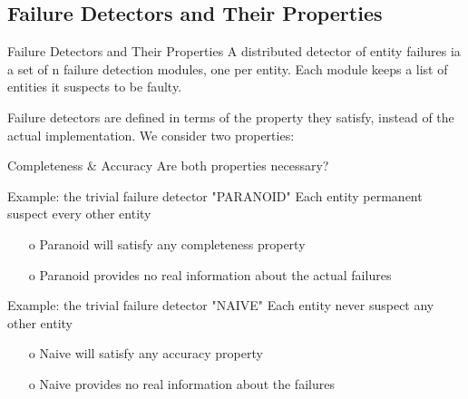 \documentclass{beamer}
\begin{document}
\subsection{Failure Detectors and Their Properties}
\begin{frame}{Failure Detectors and Their Properties}
A distributed detector of entity failures ia a set of n failure detection modules, one per entity. Each module keeps a list of entities it suspects to be faulty.
\begin{flushleft}
Failure detectors are defined in terms of the property they satisfy, instead of the actual implementation. We consider two properties:
\end{flushleft}
\begin{center}
\: \: \: \: \: \: \: \:
\end{center}
\end{frame}

\begin{frame}{Completeness $\&$ Accuracy}
Are both properties necessary?
\begin{exampleblock}{Example: the trivial failure detector "PARANOID"}
Each entity permanent suspect every other entity
\begin{itemize}
\item[o] Paranoid will satisfy any completeness property
\item[o] Paranoid provides no real information about the actual failures
\end{itemize}
\end{exampleblock}
\pause
\begin{exampleblock}{Example: the trivial failure detector "NAIVE"}
Each entity never suspect any other entity
\begin{itemize}
\item[o] Naive will satisfy any accuracy property
\item[o] Naive provides no real information about the failures
\end{itemize}
\end{exampleblock}
\end{frame}
\end{document}
